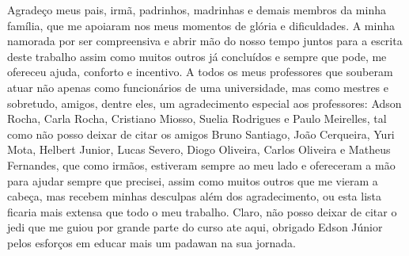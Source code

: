 \begin{agradecimentos}


Agradeço meus pais, irmã, padrinhos, madrinhas e demais membros da minha família, que me apoiaram  nos meus momentos de glória e dificuldades. A minha namorada por ser compreensiva e abrir mão do nosso tempo juntos para a escrita deste trabalho assim como muitos outros já concluídos e sempre que pode, me ofereceu ajuda, conforto e incentivo. A todos os meus professores que souberam atuar não apenas como funcionários de uma universidade, mas como mestres e sobretudo, amigos, dentre eles, um agradecimento especial aos professores: Adson Rocha, Carla Rocha, Cristiano Miosso, Suelia Rodrigues e Paulo Meirelles, tal como não posso deixar de citar os amigos Bruno Santiago, João Cerqueira, Yuri Mota, Helbert Junior, Lucas Severo, Diogo Oliveira, Carlos Oliveira e Matheus Fernandes, que como irmãos, estiveram sempre ao meu lado e ofereceram a mão para ajudar sempre que precisei, assim como muitos outros que me vieram a cabeça, mas recebem minhas desculpas além dos agradecimento, ou esta lista ficaria mais extensa que todo o meu trabalho. Claro, não posso deixar de citar o jedi que me guiou por grande parte do curso ate aqui, obrigado Edson Júnior pelos esforços em educar mais um padawan na sua jornada.

\end{agradecimentos}
